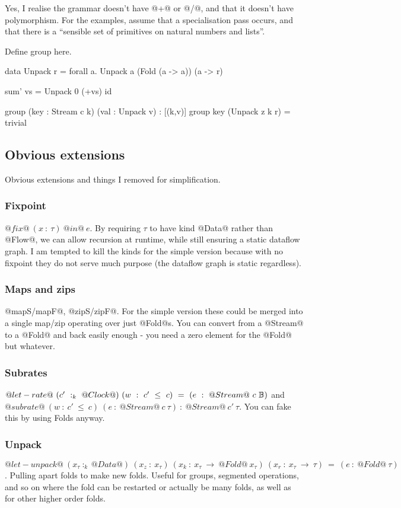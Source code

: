 Yes, I realise the grammar doesn't have @+@ or @/@, and that it doesn't have polymorphism.
For the examples, assume that a specialisation pass occurs, and that there is a ``sensible set of primitives on natural numbers and lists''.

Define group here.
\begin{code}
data Unpack r
 = forall a.
    Unpack a (Fold (a -> a)) (a -> r)

sum' vs = Unpack 0 (+vs) id

group (key : Stream c k)
      (val : Unpack v)
           : [(k,v)]
group key (Unpack z k r)
 = trivial
\end{code}





\subsection{Obvious extensions}
Obvious extensions and things I removed for simplification.

\subsubsection{Fixpoint}
$@fix@~(x~:~\tau)~@in@~e$.
By requiring $\tau$ to have kind @Data@ rather than @Flow@, we can allow recursion at runtime, while still ensuring a static dataflow graph.
I am tempted to kill the kinds for the simple version because with no fixpoint they do not serve much purpose (the dataflow graph is static regardless).

\subsubsection{ Maps and zips }
@mapS/mapF@, @zipS/zipF@.
For the simple version these could be merged into a single map/zip operating over just @Fold@s.
You can convert from a @Stream@ to a @Fold@ and back easily enough - you need a zero element for the @Fold@ but whatever.

\subsubsection{ Subrates }
$@let-rate@~(c'~:_k~@Clock@)~(w~:~c'~\le~c)~=~(e~:~@Stream@~c~\mathbb{B})$ and $@subrate@~(w~:~c'~\le~c)~(e~:~@Stream@~c~\tau)~:~@Stream@~c'~\tau$.
You can fake this by using Folds anyway.

\subsubsection{ Unpack }
$@let-unpack@~(x_\tau~:_k~@Data@)~(x_z~:~x_\tau)~(x_k~:~x_\tau~\to~@Fold@~x_\tau)~(x_r~:~x_\tau~\to~\tau)~=~(e~:~@Fold@~\tau)$.
Pulling apart folds to make new folds.
Useful for groups, segmented operations, and so on where the fold can be restarted or actually be many folds, as well as for other higher order folds.

